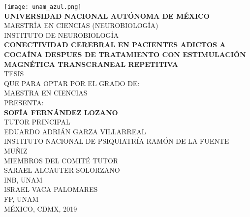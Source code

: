 \begin{titlepage}
    \begin{center}
        \texttt{[image: unam\_azul.png]}\\
        \textbf{UNIVERSIDAD NACIONAL AUTÓNOMA DE MÉXICO}\\
        MAESTRÍA EN CIENCIAS (NEUROBIOLOGÍA)\\
        INSTITUTO DE NEUROBIOLOGÍA\\
        \vspace{10mm}
        \large
        \textbf{CONECTIVIDAD CEREBRAL EN PACIENTES ADICTOS A COCAÍNA DESPUES DE TRATAMIENTO CON ESTIMULACIÓN MAGNÉTICA TRANSCRANEAL REPETITIVA}\\
        \vspace{10mm}
        \large
        TESIS\\
        \normalsize
        QUE PARA OPTAR POR EL GRADO DE:\\
        MAESTRA EN CIENCIAS\\
        \vspace{10mm}
        PRESENTA:\\
        \large
        \textbf{SOFÍA FERNÁNDEZ LOZANO}\\
        \vfill
        \normalsize
        TUTOR PRINCIPAL\\
        EDUARDO ADRIÁN GARZA VILLARREAL\\
        INSTITUTO NACIONAL DE PSIQUIATRÍA RAMÓN DE LA FUENTE MUÑIZ\\
        \vspace{3mm}
        MIEMBROS DEL COMITÉ TUTOR\\
        SARAEL ALCAUTER SOLORZANO\\
        INB, UNAM\\
        \vspace{1mm}
        ISRAEL VACA PALOMARES\\
        FP, UNAM\\
        \vspace{5mm}
        MÉXICO, CDMX, 2019
    \end{center}
\end{titlepage}
